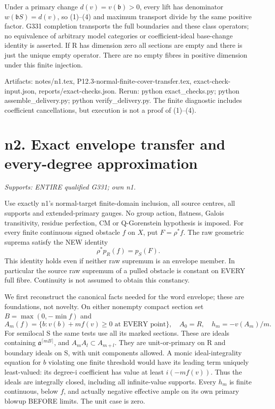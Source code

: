 \documentclass[11pt]{article}
\begin{document}
Under a primary change $d(v)=v(\mathfrak b)>0$, every lift has denominator
$w(\mathfrak bS)=d(v)$, so (1)--(4) and maximum transport divide by the
same positive factor. G331 completion transports the full boundaries and
these class operators; no equivalence of arbitrary model categories or
coefficient-ideal base-change identity is asserted. If R has dimension
zero all sections are empty and there is just the unique empty operator.
There are no empty fibres in positive dimension under this finite injection.

Artifacts: notes/n1.tex, P12.3-normal-finite-cover-transfer.tex,
exact-check-input.json, reports/exact-checks.json. Rerun:
python exact\_checks.py; python assemble\_delivery.py;
python verify\_delivery.py. The finite diagnostic includes coefficient
cancellations, but execution is not a proof of (1)--(4).

\section{n2. Exact envelope transfer and every-degree approximation}
\textit{Supports: ENTIRE qualified G331; own n1.}

Use exactly n1's normal-target finite-domain inclusion, all source centres,
all supports and extended-primary gauges. No group action, flatness,
Galois transitivity, residue perfection, CM or Q-Gorenstein hypothesis is
imposed. For every finite continuous signed obstacle $f$ on $X$, put
$F=\rho^*f$. The raw geometric suprema satisfy the NEW identity
\[
                 \rho^*p_R(f)=p_S(F).                      \tag{5}
\]
This identity holds even if neither raw supremum is an envelope member.
In particular the source raw supremum of a pulled obstacle is constant
on EVERY full fibre. Continuity is not assumed to obtain this constancy.

We first reconstruct the canonical facts needed for the word envelope;
these are foundations, not novelty. On either nonempty compact section
set $B=\max(0,-\min f)$ and
\[
 A_m(f)=\{b:v(b)+mf(v)\ge0\text{ at EVERY point}\},\quad
 A_0=R,\quad h_m=-v(A_m)/m.
\]
For semilocal S the same tests use all its marked sections. These are
ideals containing $\mathfrak a^{\lceil mB\rceil}$, and
$A_mA_l\subset A_{m+l}$. They are unit-or-primary on R and boundary
ideals on S, with unit components allowed. A monic ideal-integrality
equation for $b$ violating one finite threshold would have its leading
term uniquely least-valued: its degree-i coefficient has value at least
$i(-mf(v))$. Thus the ideals are integrally closed, including all
infinite-value supports. Every $h_m$ is finite continuous, below $f$,
and actually negative effective ample on its own primary blowup BEFORE
limits. The unit case is zero.
\end{document}
